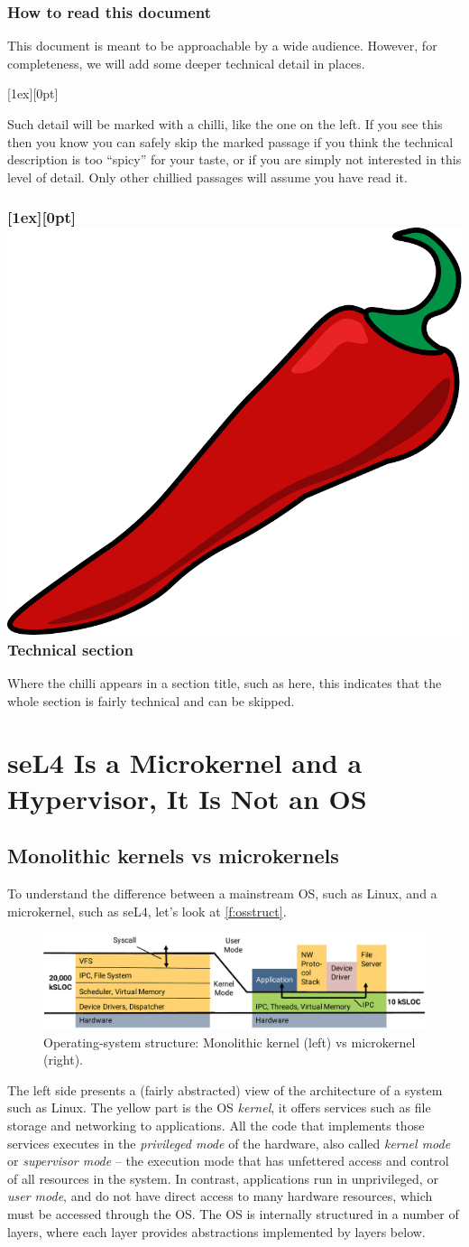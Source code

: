 \documentclass[english,a4paper,12pt\ifDraft,draft\fi]{report}
\newcommand{\Sect}[1]{\section{#1}}
\newcommand{\SSect}[1]{\subsection{#1}}
\newcommand{\SSSect}[1]{\subsubsection*{#1}}
\newcommand{\Sect}[1]{\chapter{#1}}
\newcommand{\SSect}[1]{\section{#1}}
\newcommand{\SSSect}[1]{\subsection*{#1}}
\newlength{\chillilng}\setlength{\chillilng}{8mm}
\newlength{\chillimarg}\setlength{\chillimarg}{10mm}
\newcommand{\chilli}{\includegraphics[width=\chillilng]{chilli}}
\newcommand{\chilliItem}{\raisebox{-5mm}[1ex][0pt]{%
      \makebox[\chillilng][r]{\chilli}}}
\newcommand{\chilliSect}{\raisebox{-2mm}[1ex][0pt]{\chilli\hspace{0.8em}}}
\newenvironment{Chilli}{
    \begin{list}{}{
      \setlength{\labelwidth}{\chillilng}
      \setlength{\leftmargin}{\chillimarg}}
    \item[\chilliItem]
    }
  {\end{list}}
\begin{document}
  \SSSect{How to read this document}

  This document is meant to be approachable by a wide
  audience. However, for completeness, we will add some deeper
  technical detail in places.

  \begin{Chilli}
    Such detail will be marked with a chilli, like the one on the left. If you
    see this then you know you can safely skip the marked passage if
    you think the technical description is too ``spicy'' for your
    taste, or if you are simply not interested in this level of
    detail. Only other chillied passages will assume you have read it.
  \end{Chilli}

  \SSSect{\chilliSect Technical section}
  Where the chilli appears in a section title, such as here, this
  indicates that the whole section is fairly technical and can be skipped.

  \Sect{seL4 Is a Microkernel and a Hypervisor, It Is Not an
    OS}\label{s:ukernel}

  \SSect{Monolithic kernels vs microkernels}

  To understand the difference between a mainstream OS, such as Linux,
  and a microkernel, such as seL4, let's look at
  \autoref{f:osstruct}.

  \begin{figure}[hb]
    \centering
    \includegraphics[width=1.0\textwidth]{kernel}
    \caption[Operating-system structure.]{Operating-system structure:
      Monolithic kernel (left) vs microkernel (right).}
    \label{f:osstruct}
  \end{figure}

  The left side presents a (fairly abstracted) view of the
  architecture of a system such as Linux. The yellow part is the OS
  \emph{kernel}, it offers services such as file storage and
  networking to applications.  All the code that implements those
  services executes in the \emph{privileged mode} of the hardware,
  also called \emph{kernel mode} or \emph{supervisor mode} --
  the execution mode that has unfettered access and control of all
  resources in the system. In contrast, applications run in
  unprivileged, or \emph{user mode}, and do not have direct access to
  many hardware resources, which must be accessed through the OS. The
  OS is internally structured in a number of layers, where each layer
  provides abstractions implemented by layers below.
\end{document}
